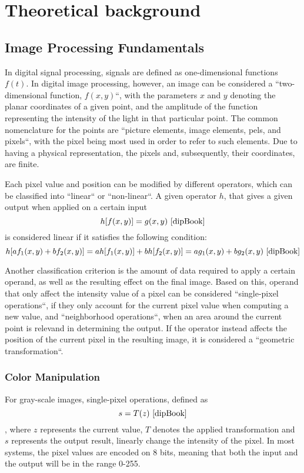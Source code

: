 \chapter{Theoretical background}

\section{Image Processing Fundamentals}

In digital signal processing, signals are defined as one-dimensional functions \(f(t)\). In digital image
processing, however, an image can be considered a ``two-dimensional function, \(f(x, y)\)``, with  the
parameters \(x\) and \(y\) denoting the planar coordinates of a given point, and the amplitude of the function
representing the intensity of the light in that particular point. The common nomenclature for the points
are ``picture elements, image elements, pels, and pixels``, with the pixel being most used in order
to refer to such elements. Due to having a physical representation, the pixels and, subsequently,
their coordinates, are finite. \cite{dipBook}

Each pixel value and position can be modified by different operators, which can be classified into ``linear``
or ``non-linear``. A given operator \(h\), that gives a given output when applied on a certain input
\[h[f(x, y)] = g(x, y) \text{ \cite{dipBook}}\] is considered linear if it satisfies the following condition:
\[h[a f_1(x, y) + b f_2(x, y)] = a h[f_1(x, y)] + b h[f_2(x, y)] =
	a g_1(x, y) + b g_2(x, y) \text{ \cite{dipBook}}\]

Another classification criterion is the amount of data required to apply a certain operand, as well as the
resulting effect on the final image. Based on this, operand that only affect the intensity value of a pixel
can be considered ``single-pixel operations``, if they only account for the current pixel value when computing
a new value, and ``neighborhood operations``, when an area around the current point is relevand in determining
the output. If the operator instead affects the position of the current pixel in the resulting image, it is
considered a ``geometric transformation``. \cite{dipBook}

\subsection{Color Manipulation}

For gray-scale images, single-pixel operations, defined as \[s = T(z) \text{ \cite{dipBook}}\], where \(z\)
represents the current value, \(T\) denotes the applied transformation and \(s\) represents the output
result, linearly change the intensity of the pixel. In most systems, the pixel values are encoded on 8 bits,
meaning that both the input and the output will be in the range 0-255.


